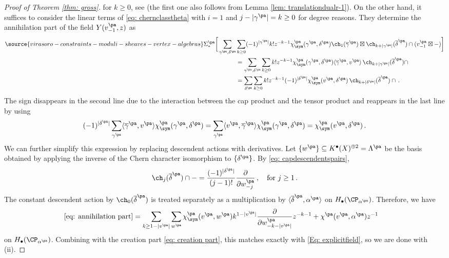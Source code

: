 \begin{proof}[Proof of Theorem \ref{thm: gross}]
for $k\geq 0$, see \cite[Lemmas 5.3, 5.5]{Gr19} (the first one also follows from Lemma \ref{lem: translationdualr-1}). On the other hand, it suffices to consider the linear terms of \eqref{eq: chernclasstheta} with $i=1$ and $j-|\gamma^{\pa}|=k\geq 0$ for degree reasons. They determine the annihilation part of the field $Y(v^{\pa}_{-1},z)$ as
\begin{align}\label{eq: annihilation part}
\source{virasoro-constraints-moduli-sheaves-vertex-algebras}
    \Sigma^{\pa}_*\bigg[\sum_{\gamma^{\pa}, \delta^{\pa}}\nonumber
    &\sum_{k\geq 0}(-1)^{|\gamma^{\pa}|}k!z^{-k-1}
    \chi^{\pa}_\sym(\gamma^{\pa}, \delta^{\pa})\ch_1(\overline \gamma^{\pa})\boxtimes\ch_{k+|\gamma^{\pa}|}(\overline \delta^{\pa})\cap (v^{\pa}_{-1}\boxtimes-)\bigg]\nonumber\\
    &=\sum_{\gamma^{\pa}, \delta^{\pa}}\sum_{k\geq 0}k!z^{-k-1}
    \chi^{\pa}_\sym(\gamma^{\pa}, \delta^{\pa})\langle\overline{\gamma}^{\pa},v^{\pa}\rangle\,\ch_{k+|\gamma^{\pa}|}(\overline \delta^{\pa})\cap \nonumber\\
    &=\sum_{\delta^{\pa}}\sum_{k\geq 0}k!z^{-k-1}
    (-1)^{|\delta^{\pa}|}\chi^{\pa}_\sym(v^{\pa}, \delta^{\pa})\,\ch_{k+|\delta^{\pa}|}(\overline \delta^{\pa})\cap\,.
\end{align}
The sign disappears in the second line due to the interaction between the cap product and the tensor product \cite[12.17]{dold} and reappears in the last line by using
\[(-1)^{|\delta^{\pa}|}\sum_{\gamma^{\pa}}\langle\overline{\gamma}^{\pa},v^{\pa}\rangle\chi^{\pa}_\sym(\gamma^{\pa}, \delta^{\pa})=\sum_{\gamma^{\pa}}\langle v^{\pa}, \overline{\gamma}^{\pa}\rangle\chi^{\pa}_\sym(\gamma^{\pa}, \delta^{\pa})=\chi^{\pa}_\sym(v^{\pa}, \delta^{\pa})\,.\]
We can further simplify this expression by replacing descendent actions with derivatives. Let $\{w^{\pa}\}\subseteq K^\bullet(X)^{\oplus 2}=\Lambda^{\pa}$ be the basis obtained by applying the inverse of the Chern character isomorphism to $\{\delta^{\pa}\}$. By \eqref{eq: capdescendentspairs},
\[\ch_j(\overline \delta^{\pa})\cap -=\frac{(-1)^{|\delta^{\pa}|}}{(j-1)!}\frac{\partial}{\partial w^{\pa}_{-j}}\, ,\quad \textup{for }j\geq 1\,. \]
The constant descendent action by $\ch_0(\overline{\delta}^{\pa})$ is treated separately as a multiplication by $\langle \overline{\delta}^{\pa},\alpha^{\pa}\rangle$ on $H_\bullet(\CP_{\alpha^{\pa}})$. Therefore, we have
\begin{align*}
    \eqref{eq: annihilation part}
    &=\sum_{k\geq 1-|v^{\pa}|}\sum_{w^{\pa}}\chi^{\pa}_{\sym}(v^{\pa},w^{\pa})k^{1-|v^{\pa}|}\frac{\partial}{\partial w^{\pa}_{-k-|v^{\pa}|}} z^{-k-1}+\chi^{\pa}(v^{\pa},\alpha^{\pa})z^{-1}
\end{align*}
on $H_\bullet(\CP_{\alpha^{\pa}})$. Combining with the creation part \eqref{eq: creation part}, this matches exactly with \eqref{Eq: explicitfield}, so we are done with (ii).


\end{proof}
